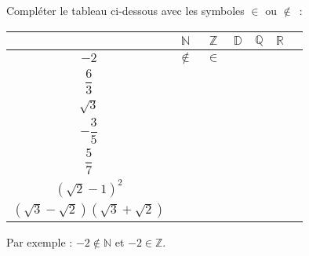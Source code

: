 
%
Compléter le tableau ci-dessous avec les symboles $\in$ ou $\notin$~:
\begin{center}
     \begin{tabular}{|c|c|c|c|c|c|c|} %
          \hline
          &  $\mathbb{N}$ &   $\mathbb{Z}$  &  $\mathbb{D}$  &  $\mathbb{Q}$  &  $\mathbb{R}$
          \\ \hline
          $-2$  &  $\notin$ & $\in$   &   &   &
          \\ \hline
          $\dfrac{6}{3}$  &   &   &   &   &
          \\ \hline
          $ \sqrt{3}$  &   &   &   &   &
          \\ \hline
          $ -\dfrac{3}{5} $&   &  &   &   &
          \\ \hline
          $\dfrac{5}{7}$  &   &  &   &   &
          \\ \hline
          $\left(\sqrt{2}-1\right)^2$  &   &  &   &   &
          \\ \hline
          $\left(\sqrt{3}-\sqrt{2}\right)\left(\sqrt{3}+\sqrt{2}\right)$  &   &  &   &   &
          \\ \hline
     \end{tabular}
\end{center}
Par exemple : $-2 \notin \mathbb{N}$ et $-2 \in \mathbb{Z}.$
